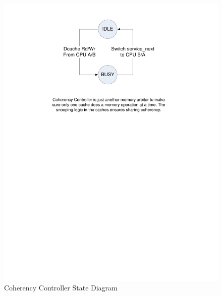 \documentclass[12pt]{article}
\begin{document}
\begin{figure}
	\begin{center}
		\includegraphics[width=7in]{cc_fsm}
	\end{center}
	\caption{Coherency Controller State Diagram}
	\label{fig:cc_fsm}
\end{figure}


\newpage
\end{document}
